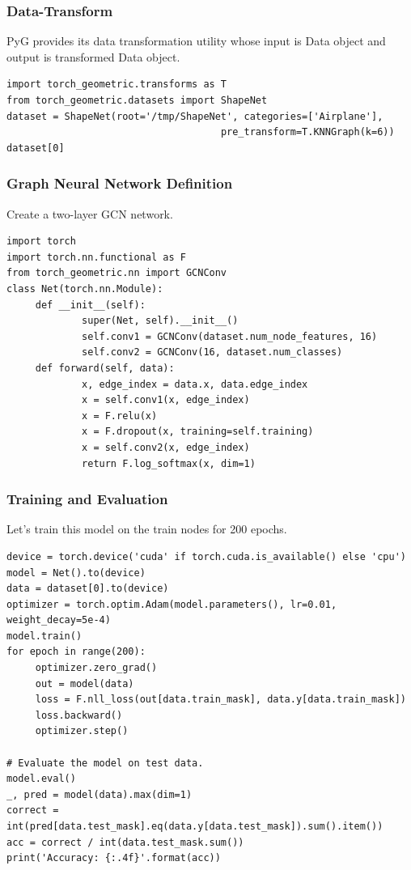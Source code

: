 \begin{frame}[fragile]\frametitle{Data-Transform}

PyG provides its data transformation utility whose input is Data object and output is transformed Data object.

\begin{lstlisting}
import torch_geometric.transforms as T
from torch_geometric.datasets import ShapeNet
dataset = ShapeNet(root='/tmp/ShapeNet', categories=['Airplane'],
									 pre_transform=T.KNNGraph(k=6))
dataset[0] 
\end{lstlisting}

\end{frame}

\begin{frame}[fragile]\frametitle{Graph Neural Network Definition}

Create a two-layer GCN network.

\begin{lstlisting}
import torch
import torch.nn.functional as F
from torch_geometric.nn import GCNConv
class Net(torch.nn.Module):
	 def __init__(self):
			 super(Net, self).__init__()
			 self.conv1 = GCNConv(dataset.num_node_features, 16)
			 self.conv2 = GCNConv(16, dataset.num_classes)
	 def forward(self, data):
			 x, edge_index = data.x, data.edge_index
			 x = self.conv1(x, edge_index)
			 x = F.relu(x)
			 x = F.dropout(x, training=self.training)
			 x = self.conv2(x, edge_index)
			 return F.log_softmax(x, dim=1) 
\end{lstlisting}

\end{frame}
\begin{frame}[fragile]\frametitle{Training and Evaluation}

Let’s train this model on the train nodes for 200 epochs.

\begin{lstlisting}
device = torch.device('cuda' if torch.cuda.is_available() else 'cpu')
model = Net().to(device)
data = dataset[0].to(device)
optimizer = torch.optim.Adam(model.parameters(), lr=0.01, weight_decay=5e-4)
model.train()
for epoch in range(200):
	 optimizer.zero_grad()
	 out = model(data)
	 loss = F.nll_loss(out[data.train_mask], data.y[data.train_mask])
	 loss.backward()
	 optimizer.step() 
	 
# Evaluate the model on test data.
model.eval()
_, pred = model(data).max(dim=1)
correct = int(pred[data.test_mask].eq(data.y[data.test_mask]).sum().item())
acc = correct / int(data.test_mask.sum())
print('Accuracy: {:.4f}'.format(acc)) 	 
\end{lstlisting}

\end{frame}
